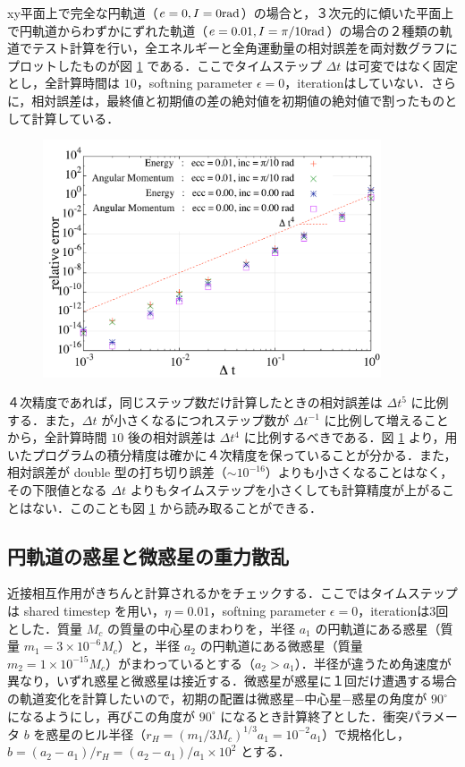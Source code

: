 \documentclass[11pt,a4paper,oneside,onecolumn]{jreport}
\begin{document}
xy平面上で完全な円軌道（$e = 0, I = 0 {\rm rad}$）の場合と，３次元的に傾いた平面上で円軌道からわずかにずれた軌道（$e = 0.01, I = \pi / 10 {\rm rad}$）の場合の２種類の軌道でテスト計算を行い，全エネルギーと全角運動量の相対誤差を両対数グラフにプロットしたものが図 \ref{fig:relative_error} である．ここでタイムステップ $\Delta t$ は可変ではなく固定とし，全計算時間は $10$，softning parameter $\epsilon = 0$，iterationはしていない．さらに，相対誤差は，最終値と初期値の差の絶対値を初期値の絶対値で割ったものとして計算している．
\begin{figure}[H]
\centering
\includegraphics[width=10cm]{./image/relative_error.pdf}
\caption{\label{fig:relative_error}}
\end{figure}
４次精度であれば，同じステップ数だけ計算したときの相対誤差は $\Delta t^5$ に比例する．また，$\Delta t$ が小さくなるにつれステップ数が $\Delta t^{-1}$ に比例して増えることから，全計算時間 $10$ 後の相対誤差は $\Delta t^4$ に比例するべきである．図 \ref{fig:relative_error} より，用いたプログラムの積分精度は確かに４次精度を保っていることが分かる．また，相対誤差が double 型の打ち切り誤差（$\sim 10^{-16}$）よりも小さくなることはなく，その下限値となる $\Delta t$ よりもタイムステップを小さくしても計算精度が上がることはない．このことも図 \ref{fig:relative_error} から読み取ることができる．

\subsection{円軌道の惑星と微惑星の重力散乱}
近接相互作用がきちんと計算されるかをチェックする．ここではタイムステップは shared timestep を用い，$\eta = 0.01$，softning parameter $\epsilon = 0$，iterationは3回とした．質量 $M_c$ の質量の中心星のまわりを，半径 $a_1$ の円軌道にある惑星（質量 $m_1 = 3 \times 10^{-6} M_c$）と，半径 $a_2$ の円軌道にある微惑星（質量 $m_2 = 1 \times 10^{-15} M_c$）がまわっているとする（$a_2 > a_1$）．半径が違うため角速度が異なり，いずれ惑星と微惑星は接近する．微惑星が惑星に１回だけ遭遇する場合の軌道変化を計算したいので，初期の配置は微惑星−中心星−惑星の角度が $90^{\circ}$ になるようにし，再びこの角度が $90^{\circ}$ になるとき計算終了とした．衝突パラメータ $b$ を惑星のヒル半径（$r_H = (m_1 / 3 M_c)^{1/3} a_1 = 10^{-2} a_1$）で規格化し，$b = (a_2 - a_1) / r_H = (a_2 - a_1) / a_1 \times 10^2$ とする．
\end{document}
